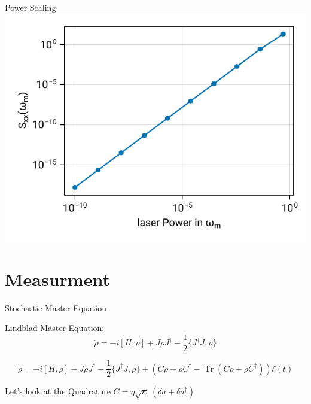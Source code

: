 \documentclass{beamer}
\DeclareMathOperator{\Tr}{Tr}
\begin{document}
\begin{frame}{Power Scaling}
	\centering
	\includegraphics{figures/03 power sweep.pdf}
\end{frame}

\section{Measurment}
\begin{frame}{Stochastic Master Equation}
	
	{
		\color{seegrau}
		Lindblad Master Equation:
		$$\dot\rho = -i[H,\rho] + J\rho J^\dagger - \frac{1}{2} \{J^\dagger J, \rho\}$$
	}

	$$
		\dot\rho 
		= -i[H,\rho] 
		+ J\rho J^\dagger - \frac{1}{2} \{J^\dagger J, \rho\} 
		+ \left(C\rho + \rho C^\dagger - \Tr(C\rho + \rho C^\dagger)\right)\xi(t)
	$$

	Let's look at the Quadrature $C = \eta\sqrt{\kappa}\;(\delta a + \delta a^\dagger)$

\end{frame}


{
	\begin{frame}[plain]{}\end{frame}
}
\end{document}
